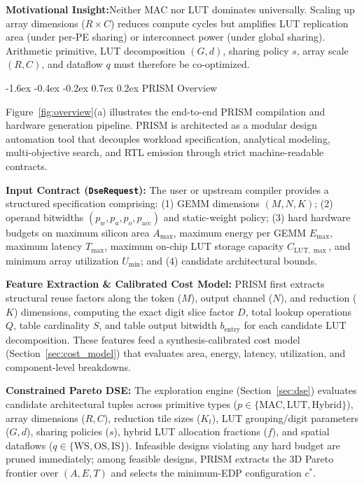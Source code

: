 \documentclass[10pt,letterpaper,twocolumn]{article}
\makeatletter
\renewcommand\section{\@startsection {section}{1}{\z@}%
  {-1.6ex \@plus -0.4ex \@minus -0.2ex}%
  {0.7ex \@plus 0.2ex}%
  {\normalfont\large\bfseries\color{primary}}}
\newcommand{\takeaway}[2]{%
  \vspace{2pt}%
  \noindent\colorbox{boxbg}{%
    \parbox{\dimexpr\columnwidth-2\fboxsep\relax}{%
      \vspace{1.5pt}\footnotesize\textbf{\color{primary}#1:}\hspace{0.35em}#2\vspace{1.5pt}%
    }%
  }%
  \vspace{2pt}%
}
\makeatother
\begin{document}
\takeaway{Motivational Insight}{Neither MAC nor LUT dominates universally. Scaling up array dimensions ($R \times C$) reduces compute cycles but amplifies LUT replication area (under per-PE sharing) or interconnect power (under global sharing). Arithmetic primitive, LUT decomposition $(G,d)$, sharing policy $s$, array scale $(R,C)$, and dataflow $q$ must therefore be co-optimized.}

\section{PRISM Overview}

Figure~\ref{fig:overview}(a) illustrates the end-to-end PRISM compilation and hardware generation pipeline. PRISM is architected as a modular design automation tool that decouples workload specification, analytical modeling, multi-objective search, and RTL emission through strict machine-readable contracts.

\textbf{Input Contract (\texttt{DseRequest}):} The user or upstream compiler provides a structured specification comprising: (1) GEMM dimensions $(M, N, K)$; (2) operand bitwidths $(p_w, p_a, p_o, p_{\text{acc}})$ and static-weight policy; (3) hard hardware budgets on maximum silicon area $A_{\max}$, maximum energy per GEMM $E_{\max}$, maximum latency $T_{\max}$, maximum on-chip LUT storage capacity $C_{\text{LUT},\max}$, and minimum array utilization $U_{\min}$; and (4) candidate architectural bounds.

\textbf{Feature Extraction \& Calibrated Cost Model:} PRISM first extracts structural reuse factors along the token ($M$), output channel ($N$), and reduction ($K$) dimensions, computing the exact digit slice factor $D$, total lookup operations $Q$, table cardinality $S$, and table output bitwidth $b_{\text{entry}}$ for each candidate LUT decomposition. These features feed a synthesis-calibrated cost model (Section~\ref{sec:cost_model}) that evaluates area, energy, latency, utilization, and component-level breakdowns.

\textbf{Constrained Pareto DSE:} The exploration engine (Section~\ref{sec:dse}) evaluates candidate architectural tuples across primitive types ($p \in \{\text{MAC}, \text{LUT}, \text{Hybrid}\}$), array dimensions ($R, C$), reduction tile sizes ($K_t$), LUT grouping/digit parameters ($G, d$), sharing policies ($s$), hybrid LUT allocation fractions ($f$), and spatial dataflows ($q \in \{\text{WS}, \text{OS}, \text{IS}\}$). Infeasible designs violating any hard budget are pruned immediately; among feasible designs, PRISM extracts the 3D Pareto frontier over $(A, E, T)$ and selects the minimum-EDP configuration $c^*$.
\end{document}
